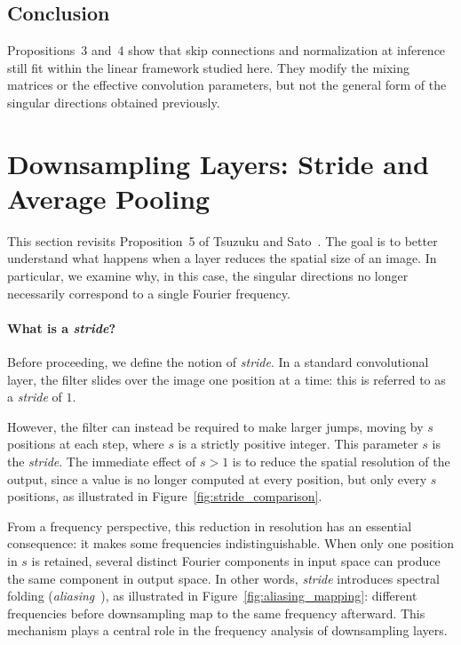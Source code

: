 \subsection{Conclusion}

Propositions~3 and~4 show that skip connections and normalization at inference
still fit within the linear framework studied here. They modify the mixing matrices or the
effective convolution parameters, but not the general form of the singular directions obtained
previously.

\section{Downsampling Layers: Stride and Average Pooling}
\label{sec:couches-reduction-stride-pooling}

This section revisits Proposition~5 of Tsuzuku and Sato~\cite{tsuzuku2019structural}. The goal is to better understand
what happens when a layer reduces the spatial size of an image. In particular, we examine
why, in this case, the singular directions no longer necessarily correspond to a single
Fourier frequency.

\paragraph{What is a \textit{stride}?}

Before proceeding, we define the notion of \textit{stride}.
In a standard convolutional layer, the filter slides over the image one position at a time:
this is referred to as a \textit{stride} of $1$.

However, the filter can instead be required to make larger jumps, moving by $s$ positions at
each step, where $s$ is a strictly positive integer. This parameter $s$ is the \textit{stride}.
The immediate effect of $s > 1$ is to reduce the spatial resolution of the output, since a value is no longer computed
at every position, but only every $s$ positions, as illustrated in Figure~\ref{fig:stride_comparison}.

From a frequency perspective, this reduction in resolution has an essential consequence:
it makes some frequencies indistinguishable. When only one position in $s$ is retained,
several distinct Fourier components in input space can produce the same component
in output space. In other words, \textit{stride} introduces spectral folding
(\textit{aliasing}~\cite{gonzalez2008digital}), as illustrated in Figure~\ref{fig:aliasing_mapping}: different
frequencies before downsampling map to the same frequency afterward.
This mechanism plays a central role in the frequency analysis of downsampling layers.

